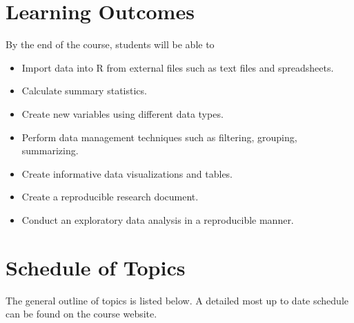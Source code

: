 \documentclass[
  11pt,
]{article}
\providecommand{\tightlist}{%
  \setlength{\itemsep}{0pt}\setlength{\parskip}{0pt}}
\begin{document}
\hypertarget{learning-outcomes}{%
\section{Learning Outcomes}\label{learning-outcomes}}

By the end of the course, students will be able to

\begin{itemize}
\tightlist
\item
  Import data into R from external files such as text files and
  spreadsheets.
\item
  Calculate summary statistics.
\item
  Create new variables using different data types.
\item
  Perform data management techniques such as filtering, grouping,
  summarizing.
\item
  Create informative data visualizations and tables.
\item
  Create a reproducible research document.
\item
  Conduct an exploratory data analysis in a reproducible manner.
\end{itemize}

\hypertarget{schedule-of-topics}{%
\section{Schedule of Topics}\label{schedule-of-topics}}

The general outline of topics is listed below. A detailed most up to
date schedule can be found on the course website.
\end{document}
